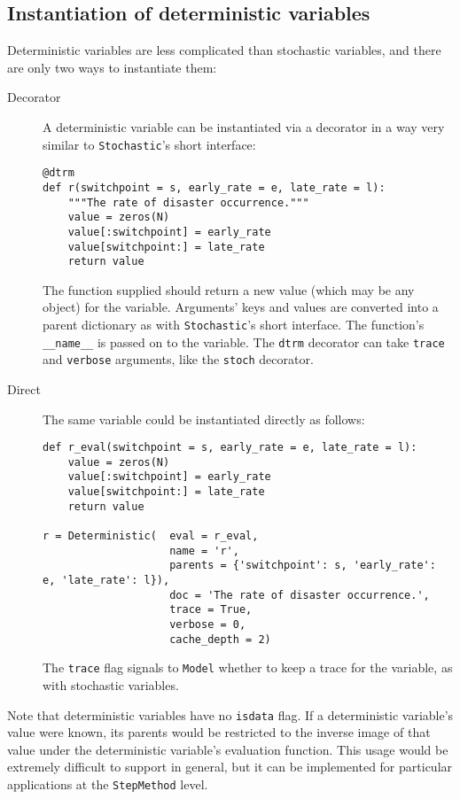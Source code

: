 \subsection{Instantiation of deterministic variables}
Deterministic variables are less complicated than stochastic variables, and there are only two ways to instantiate them:
\begin{description}
    \item[Decorator] A deterministic variable can be instantiated via a decorator in a way very similar to \texttt{Stochastic}'s short interface:
\begin{verbatim}
@dtrm
def r(switchpoint = s, early_rate = e, late_rate = l):
    """The rate of disaster occurrence."""
    value = zeros(N)
    value[:switchpoint] = early_rate
    value[switchpoint:] = late_rate
    return value
\end{verbatim}
The function supplied should return a new value (which may be any object) for the variable. Arguments' keys and values are converted into a parent dictionary as with \texttt{Stochastic}'s short interface. The function's \texttt{__name__} is passed on to the variable. The \texttt{dtrm} decorator can take \texttt{trace} and \texttt{verbose} arguments, like the \texttt{stoch} decorator.
    \item[Direct] The same variable could be instantiated directly as follows:
\begin{verbatim}
def r_eval(switchpoint = s, early_rate = e, late_rate = l):
    value = zeros(N)
    value[:switchpoint] = early_rate
    value[switchpoint:] = late_rate
    return value

r = Deterministic(  eval = r_eval, 
                    name = 'r',
                    parents = {'switchpoint': s, 'early_rate': e, 'late_rate': l}),
                    doc = 'The rate of disaster occurrence.',
                    trace = True,
                    verbose = 0,
                    cache_depth = 2)
\end{verbatim}
The \texttt{trace} flag signals to \texttt{Model} whether to keep a trace for the variable, as with stochastic variables.
\end{description}

Note that deterministic variables have no \texttt{isdata} flag. If a deterministic variable's value were known, its parents would be restricted to the inverse image of that value under the deterministic variable's evaluation function. This usage would be extremely difficult to support in general, but it can be implemented for particular applications at the \texttt{StepMethod} level.

